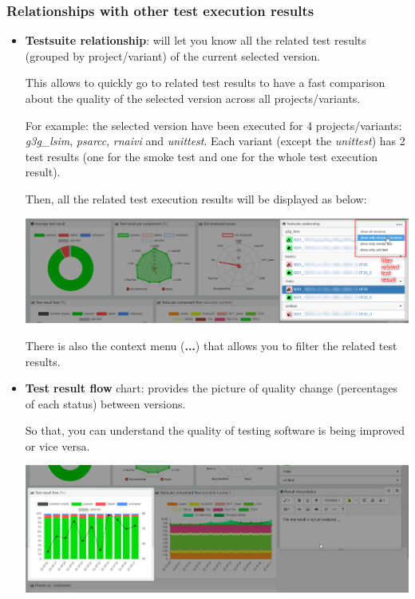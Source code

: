 \subsubsection{Relationships with other test execution results}

\begin{itemize}
\item \textbf{Testsuite relationship}: will let you know all the related test
results (grouped by project/variant) of the current selected version.

This allows to quickly go to related test results to have a fast comparison
about the quality of the selected version across all projects/variants.

For example: the selected version have been executed for 4
projects/variants: \emph{g3g\_lsim}, \emph{psarcc}, \emph{rnaivi} and
\emph{unittest}. Each variant (except the \emph{unittest}) has 2 test results
(one for the smoke test and one for the whole test execution result).

Then, all the related test execution results will be displayed as below:

\includegraphics[width=1\linewidth]
{./pictures/dashboard/testsuite_relationship.png}

There is also the context menu (\textbf{...}) that allows you to filter the
related test results.

\item \textbf{Test result flow} chart: provides the picture of quality change
(percentages of each status) between versions.

So that, you can understand the quality of testing software is being improved
or vice versa.

\includegraphics[width=1\linewidth]
{./pictures/dashboard/chart_test_result_flow.png}


\end{itemize}
